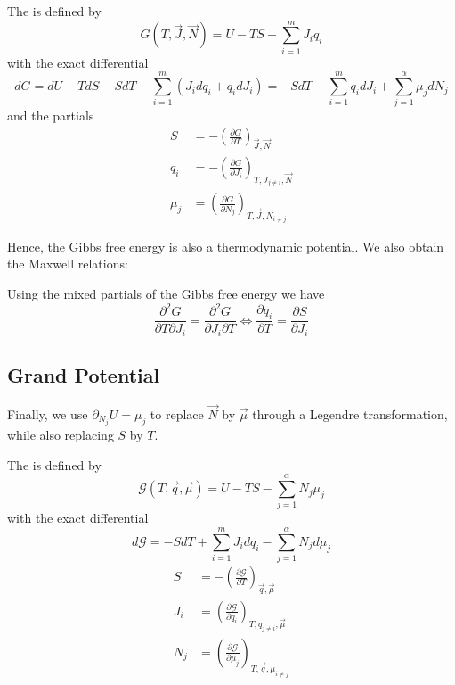 \documentclass[12pt, a4paper, oneside, openright, titlepage]{book}
\begin{document}
\begin{defn}
    The  is defined by \begin{equation*}
        G(T,\vec{J},\vec{N}) = U - TS - \sum_{i=1}^mJ_iq_i
    \end{equation*}
    with the exact differential \begin{equation*}
        dG = dU - TdS - SdT - \sum_{i=1}^m(J_idq_i+q_idJ_i) = -SdT - \sum_{i=1}^mq_idJ_i + \sum_{j=1}^{\alpha}\mu_jdN_j
    \end{equation*}
    and the partials \begin{align*}
        S &= -\left(\frac{\partial G}{\partial T}\right)_{\vec{J},\vec{N}} \\
        q_i &= -\left(\frac{\partial G}{\partial J_i}\right)_{T,J_{j\neq i},\vec{N}} \\
        \mu_j &=  \left(\frac{\partial G}{\partial N_j}\right)_{T,\vec{J},N_{i\neq j}} 
    \end{align*}
\end{defn}

Hence, the Gibbs free energy is also a thermodynamic potential. We also obtain the Maxwell relations:

\begin{prop}
    Using the mixed partials of the Gibbs free energy we have \begin{equation*}
        \frac{\partial^2G}{\partial T\partial J_i} = \frac{\partial^2G}{\partial J_i\partial T}\iff \frac{\partial q_i}{\partial T} = \frac{\partial S}{\partial J_i}
    \end{equation*}
\end{prop}


\subsection{Grand Potential}

Finally, we use $\partial_{N_j}U = \mu_j$ to replace $\vec{N}$ by $\vec{\mu}$ through a Legendre transformation, while also replacing $S$ by $T$. 
\begin{defn}
    The  is defined by \begin{equation*}
        \mathcal{G}(T,\vec{q},\vec{\mu}) = U - TS - \sum_{j=1}^{\alpha}N_j\mu_j
    \end{equation*}
    with the exact differential \begin{equation*}
        d\mathcal{G} = -SdT + \sum_{i=1}^mJ_idq_i - \sum_{j=1}^{\alpha}N_jd\mu_j
    \end{equation*}
    \begin{align*}
        S &= -\left(\frac{\partial \mathcal{G}}{\partial T}\right)_{\vec{q},\vec{\mu}} \\
        J_i &= \left(\frac{\partial \mathcal{G}}{\partial q_i}\right)_{T,q_{j\neq i},\vec{\mu}} \\
        N_j &=  \left(\frac{\partial \mathcal{G}}{\partial \mu_j}\right)_{T,\vec{q},\mu_{i\neq j}} 
    \end{align*}
\end{defn}
\end{document}
